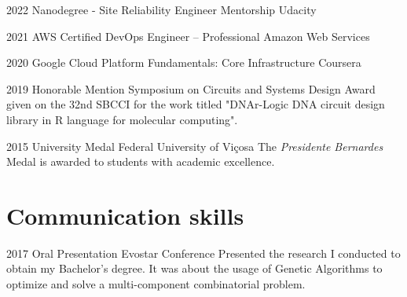 \documentclass[a4paper]{cv-friggeri-x}
\begin{document}
\begin{entrylist}


\entry
    {2022}
    {Nanodegree - Site Reliability Engineer Mentorship}
    {Udacity}

\entry
    {2021}
    {AWS Certified DevOps Engineer – Professional}
    {Amazon Web Services}

\entry
    {2020}
    {Google Cloud Platform Fundamentals: Core Infrastructure}
    {Coursera}

\entry
    {2019}
    {Honorable Mention}
    {Symposium on Circuits and Systems Design}
    {Award given on the 32nd SBCCI for the work titled "DNAr-Logic DNA circuit design library in R language for molecular computing".}

\entry
    {2015}
    {University Medal}
    {Federal University of Vi\c cosa}
    {The \textit{Presidente Bernardes} Medal is awarded to students with academic excellence.}


\end{entrylist}


\section{Communication skills}

\begin{entrylist}


\entry
{2017}
{Oral Presentation}
{Evostar Conference}
{Presented the research I conducted to obtain my Bachelor's degree. It was about the usage of Genetic Algorithms to optimize and solve a multi-component combinatorial problem.}


\end{entrylist}

\end{document}
